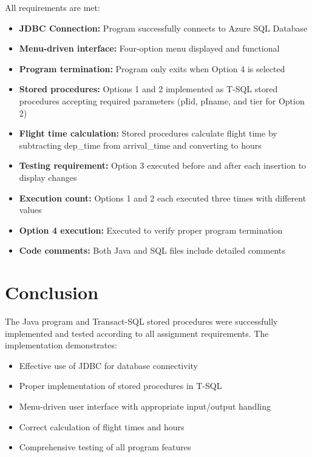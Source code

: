 \documentclass[12pt]{article}
\begin{document}
All requirements are met:

\begin{itemize}
    \item \textbf{JDBC Connection:} Program successfully connects to Azure SQL Database
    \item \textbf{Menu-driven interface:} Four-option menu displayed and functional
    \item \textbf{Program termination:} Program only exits when Option 4 is selected
    \item \textbf{Stored procedures:} Options 1 and 2 implemented as T-SQL stored procedures accepting required parameters (pIid, pIname, and tier for Option 2)
    \item \textbf{Flight time calculation:} Stored procedures calculate flight time by subtracting dep\_time from arrival\_time and converting to hours
    \item \textbf{Testing requirement:} Option 3 executed before and after each insertion to display changes
    \item \textbf{Execution count:} Options 1 and 2 each executed three times with different values
    \item \textbf{Option 4 execution:} Executed to verify proper program termination
    \item \textbf{Code comments:} Both Java and SQL files include detailed comments
\end{itemize}

\section{Conclusion}

The Java program and Transact-SQL stored procedures were successfully implemented and tested according to all assignment requirements. The implementation demonstrates:

\begin{itemize}
    \item Effective use of JDBC for database connectivity
    \item Proper implementation of stored procedures in T-SQL
    \item Menu-driven user interface with appropriate input/output handling
    \item Correct calculation of flight times and hours
    \item Comprehensive testing of all program features
\end{itemize}
\end{document}
